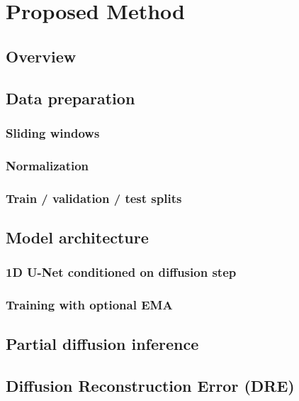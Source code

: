 \chapter{Proposed Method}
\label{ch:method}

\section{Overview}

\section{Data preparation}
\subsection{Sliding windows}
\subsection{Normalization}
\subsection{Train / validation / test splits}

\section{Model architecture}
\subsection{1D U-Net conditioned on diffusion step}
\subsection{Training with optional EMA}

\section{Partial diffusion inference}

\section{Diffusion Reconstruction Error (DRE)}

